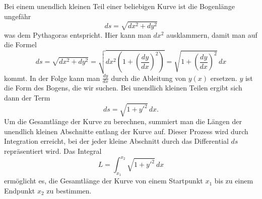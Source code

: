 Bei einem unendlich kleinen Teil einer beliebigen Kurve ist die Bogenlänge ungefähr
\begin{equation}
	ds
	=
	\sqrt{dx^2 + dy^2}
	\label{kettenlinie:equation1}
\end{equation}
was dem Pythagoras entspricht.
Hier kann man \(dx^2\) ausklammern, damit man auf die Formel
\begin{equation}
	ds
	=
	\sqrt{dx^2 + dy^2}
	=
	\sqrt{dx^2 \left( 1 + \left( \frac{dy}{dx} \right)^2 \right)}
	=
	\sqrt{1 + \left( \frac{dy}{dx} \right)^2} \, dx
\end{equation}
kommt.
In der Folge kann man \(\frac{dy}{dx}\) durch die Ableitung von \(y(x)\) ersetzen.
\(y\) ist die Form des Bogens, die wir suchen.
Bei unendlich kleinen Teilen ergibt sich dann der Term
\begin{equation}
	ds
	=
	\sqrt{1 + y'^2} \, dx.
\end{equation}
Um die Gesamtlänge der Kurve zu berechnen, summiert man die Längen der unendlich kleinen Abschnitte entlang der Kurve auf.
Dieser Prozess wird durch Integration erreicht, bei der jeder kleine Abschnitt durch das Differential \(ds\) repräsentiert wird.
Das Integral
\begin{equation}
	L
	=
	\int_{x_1}^{x_2} \sqrt{1 + y'^2} \, dx
\end{equation}
ermöglicht es, die Gesamtlänge der Kurve von einem Startpunkt \(x_1\) bis zu einem Endpunkt \(x_2\) zu bestimmen.

